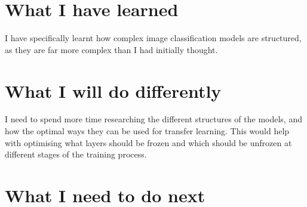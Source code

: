 \documentclass[]{final_report}
\begin{document}
\section{What I have learned}
I have specifically learnt how complex image classification models are structured, as they are far more complex than I had initially thought.

\section{What I will do differently}
I need to spend more time researching the different structures of the models, and how the optimal ways they can be used for transfer learning.
This would help with optimising what layers should be frozen and which should be unfrozen at different stages of the training process.

\section{What I need to do next}



\newpage
\printbibliography
\label{endpage}
\end{document}
